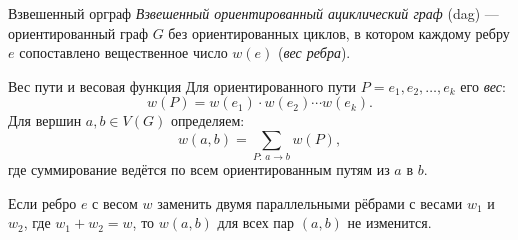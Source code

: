 \begin{Definition}{Взвешенный орграф}{}
	\emph{Взвешенный ориентированный ациклический граф} (dag) — ориентированный граф $G$ без ориентированных циклов, в котором каждому ребру $e$ сопоставлено вещественное число $w(e)$ (\emph{вес ребра}).
\end{Definition}

\begin{Definition}{Вес пути и весовая функция}{}
	Для ориентированного пути $P = e_1, e_2, \ldots, e_k$ его \emph{вес}:
	\[
	w(P) = w(e_1)\cdot w(e_2) \cdots w(e_k).
	\]
	Для вершин $a, b \in V(G)$ определяем:
	\[
	w(a,b) = \sum_{P:\,a \to b} w(P),
	\]
	где суммирование ведётся по всем ориентированным путям из $a$ в $b$.
\end{Definition}

\begin{Remark}{}{}
	Если ребро $e$ с весом $w$ заменить двумя параллельными рёбрами с весами $w_1$ и $w_2$,
	где $w_1 + w_2 = w$, то $w(a,b)$ для всех пар $(a,b)$ не изменится.
\end{Remark}

